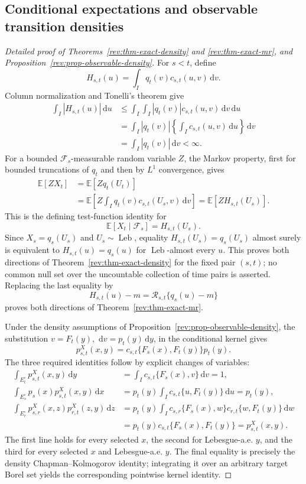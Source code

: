 \documentclass[11pt]{article}
\theoremstyle{remark}
\newcommand{\E}{\mathbb E}
\newcommand{\dd}{\,\mathrm d}
\newcommand{\Leb}{\operatorname{Leb}}
\begin{document}
\subsection{Conditional expectations and observable transition densities}
\label{rev:app-conditional-kernel-proof}

\begin{proof}[Detailed proof of Theorems~\ref{rev:thm-exact-density} and
\ref{rev:thm-exact-mr}, and Proposition~\ref{rev:prop-observable-density}]
For $s<t$, define
\[
H_{s,t}(u)=\int_Iq_t(v)c_{s,t}(u,v)\dd v.
\]
Column normalization and Tonelli's theorem give
\begin{align*}
\int_I|H_{s,t}(u)|\dd u
&\le\int_I\int_I|q_t(v)|c_{s,t}(u,v)\dd v\dd u\\
&=\int_I|q_t(v)|
   \left\{\int_Ic_{s,t}(u,v)\dd u\right\}\dd v\\
&=\int_I|q_t(v)|\dd v<\infty.
\end{align*}
For a bounded $\mathcal F_s$-measurable random variable $Z$, the Markov
property, first for bounded truncations of $q_t$ and then by $L^1$ convergence,
gives
\begin{align*}
\E[ZX_t]
&=\E[Zq_t(U_t)]\\
&=\E\!\left[Z\int_Iq_t(v)c_{s,t}(U_s,v)\dd v\right]
=\E[ZH_{s,t}(U_s)].
\end{align*}
This is the defining test-function identity for
\[
\E[X_t\mid\mathcal F_s]=H_{s,t}(U_s).
\]
Since $X_s=q_s(U_s)$ and $U_s\sim\Leb$, equality
$H_{s,t}(U_s)=q_s(U_s)$ almost surely is equivalent to
$H_{s,t}(u)=q_s(u)$ for $\Leb$-almost every $u$.  This proves both directions
of Theorem~\ref{rev:thm-exact-density} for the fixed pair $(s,t)$; no common
null set over the uncountable collection of time pairs is asserted.  Replacing
the last equality by
\[
H_{s,t}(u)-m=\mathcal R_{s,t}\{q_s(u)-m\}
\]
proves both directions of Theorem~\ref{rev:thm-exact-mr}.

Under the density assumptions of
Proposition~\ref{rev:prop-observable-density}, the substitution
$v=F_t(y)$, $\dd v=p_t(y)\dd y$, in the conditional kernel gives
\[
p^X_{s,t}(x,y)
=c_{s,t}\{F_s(x),F_t(y)\}p_t(y).
\]
The three required identities follow by explicit changes of variables:
\begin{align*}
\int_{E_t^\circ}p^X_{s,t}(x,y)\dd y
&=\int_Ic_{s,t}\{F_s(x),v\}\dd v=1,\\
\int_{E_s^\circ}p_s(x)p^X_{s,t}(x,y)\dd x
&=p_t(y)\int_Ic_{s,t}\{u,F_t(y)\}\dd u=p_t(y),\\
\int_{E_r^\circ}p^X_{s,r}(x,z)p^X_{r,t}(z,y)\dd z
&=p_t(y)\int_Ic_{s,r}\{F_s(x),w\}
                   c_{r,t}\{w,F_t(y)\}\dd w\\
&=p_t(y)c_{s,t}\{F_s(x),F_t(y)\}
=p^X_{s,t}(x,y).
\end{align*}
The first line holds for every selected $x$, the second for Lebesgue-a.e. $y$,
and the third for every selected $x$ and Lebesgue-a.e. $y$.  The final equality
is precisely the density Chapman--Kolmogorov identity; integrating it over an
arbitrary target Borel set yields the corresponding pointwise kernel identity.
\end{proof}
\end{document}
